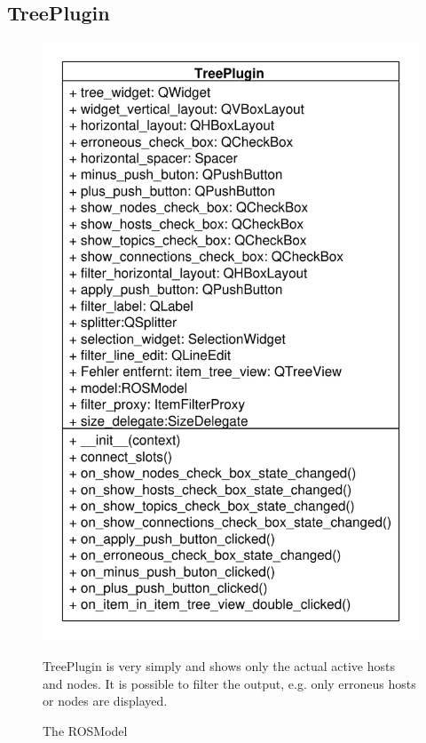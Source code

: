 \subsection{TreePlugin}
\begin{figure}[htbp]
	\begin{minipage}[t]{7cm}
		\vspace{0pt}
		\centering
		\includegraphics[scale=0.6]{./diagram_pictures/Tree.pdf}
		\caption{The ROSModel}
	\end{minipage}
	\hfill
	\begin{minipage}[t]{7cm}
		\vspace{10pt}
		TreePlugin is very simply and shows only the actual active hosts
		and nodes. It is possible to filter the output, e.g. only erroneus hosts or
		nodes are displayed.
	\end{minipage}
\end{figure} 
